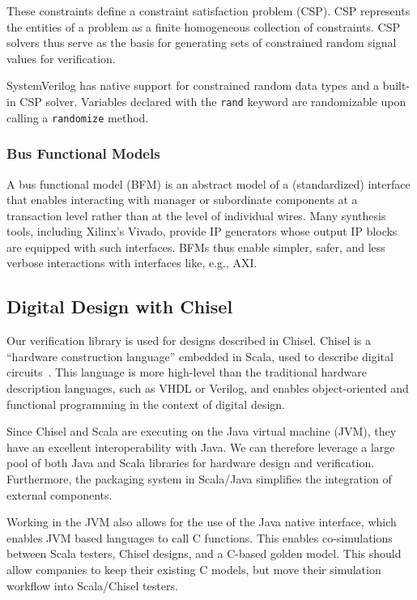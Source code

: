 \documentclass[conference]{IEEEtran}
\begin{document}
These constraints define a constraint satisfaction problem (CSP).
CSP represents the entities of a problem as a finite homogeneous collection of constraints. 
CSP solvers thus serve as the basis for generating sets of constrained random signal values for verification.

SystemVerilog has native support for constrained random data types and a built-in CSP solver. 
Variables declared with the \texttt{rand} keyword are randomizable upon calling a \texttt{randomize} method.

\subsubsection{Bus Functional Models}
A bus functional model (BFM) is an abstract model of a (standardized) interface that enables interacting with manager or subordinate components at a transaction level rather than at the level of individual wires.
Many synthesis tools, including Xilinx's Vivado, provide IP generators whose output IP blocks are equipped with such interfaces. 
BFMs thus enable simpler, safer, and less verbose interactions with interfaces like, e.g., AXI.

\subsection{Digital Design with Chisel}
Our verification library is used for designs described in Chisel.
Chisel is a ``hardware construction language'' embedded in Scala, used to describe digital circuits~\cite{chisel:dac2012}.
This language is more high-level than the traditional hardware description languages, such as VHDL or Verilog, and enables object-oriented and functional programming in the context of digital design.

Since Chisel and Scala are executing on the Java virtual machine (JVM), they have an excellent interoperability with Java. 
We can therefore leverage a large pool of both Java and Scala libraries for hardware design and verification. 
Furthermore, the packaging system in Scala/Java simplifies the integration of external components.

Working in the JVM also allows for the use of the Java native interface, which enables JVM based languages to call C functions.
This enables co-simulations between Scala testers, Chisel designs, and a C-based golden model. 
This should allow companies to keep their existing C models, but move their simulation workflow into Scala/Chisel testers.
\end{document}
